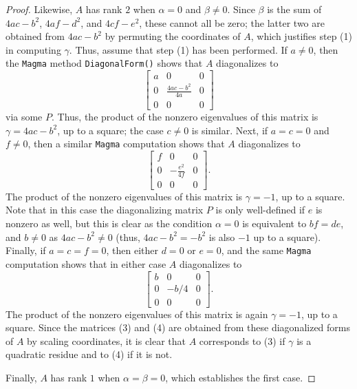 \documentclass[10pt,a4paper]{amsart}
\numberwithin{equation}{section}
\numberwithin{figure}{section}
\theoremstyle{definition}
\theoremstyle{remark}
\theoremstyle{plain}
\theoremstyle{plain}
\theoremstyle{definition}
\theoremstyle{plain}
\theoremstyle{plain}
\begin{document}
\begin{proof}
	Likewise, $A$ has rank $2$ when $\alpha=0$ and $\beta\ne 0$. Since $\beta$ is the sum of $4ac-b^2$, $4af-d^2$, and $4cf-e^2$, these cannot all be zero; the latter two are obtained from $4ac-b^2$ by permuting the coordinates of $A$, which justifies step (1) in computing $\gamma$. Thus, assume that step (1) has been performed. If $a\ne 0$, then the \texttt{Magma} method \texttt{DiagonalForm()} shows that $A$ diagonalizes to
	\begin{equation*}
	\begin{bmatrix}
	a&0&0\\
	0&\frac{4ac-b^2}{4a}&0\\
	0&0&0
	\end{bmatrix}
	\end{equation*}
	via some $P$. Thus, the product of the nonzero eigenvalues of this matrix is $\gamma=4ac-b^2$, up to a square; the case $c\ne 0$ is similar. Next, if $a=c=0$ and $f\ne 0$, then a similar \texttt{Magma} computation shows that $A$ diagonalizes to
	\begin{equation*}
	\begin{bmatrix}
	f&0&0\\
	0&-\frac{e^2}{4f}&0\\
	0&0&0
	\end{bmatrix}.
	\end{equation*}
	The product of the nonzero eigenvalues of this matrix is $\gamma=-1$, up to a square. Note that in this case the diagonalizing matrix $P$ is only well-defined if $e$ is nonzero as well, but this is clear as the condition $\alpha=0$ is equivalent to $bf=de$, and $b\ne 0$ as $4ac-b^2\ne 0$ (thus, $4ac-b^2=-b^2$ is also $-1$ up to a square). Finally, if $a=c=f=0$, then either $d=0$ or $e=0$, and the same \texttt{Magma} computation shows that in either case $A$ diagonalizes to 
	\begin{equation*}
	\begin{bmatrix}
	b&0&0\\
	0&-b/4&0\\
	0&0&0
	\end{bmatrix}.
	\end{equation*}
	The product of the nonzero eigenvalues of this matrix is again $\gamma=-1$, up to a square. Since the matrices (3) and (4) are obtained from these diagonalized forms of $A$ by scaling coordinates, it is clear that $A$ corresponds to (3) if $\gamma$ is a quadratic residue and to (4) if it is not.
	
	Finally, $A$ has rank $1$ when $\alpha=\beta=0$, which establishes the first case.
	\end{proof}
	
\end{document}
